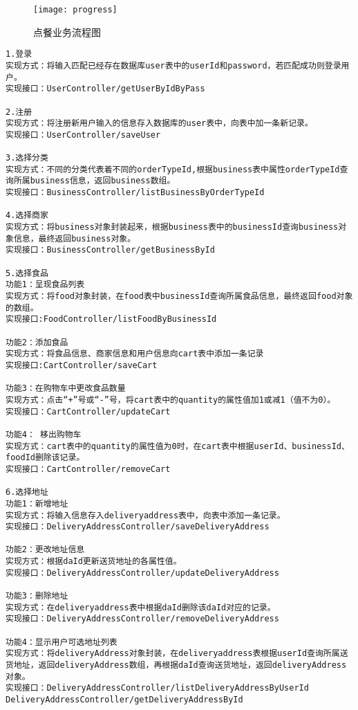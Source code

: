 \begin{figure}[htbp]
\centering
\texttt{[image: progress]}
\caption{点餐业务流程图}\label{fig:xml}
\vspace{\baselineskip}
\end{figure}
\begin{verbatim}
1.登录
实现方式：将输入匹配已经存在数据库user表中的userId和password，若匹配成功则登录用户。
实现接口：UserController/getUserByIdByPass

2.注册
实现方式：将注册新用户输入的信息存入数据库的user表中，向表中加一条新记录。
实现接口：UserController/saveUser

3.选择分类
实现方式：不同的分类代表着不同的orderTypeId,根据business表中属性orderTypeId查询所属business信息，返回business数组。
实现接口：BusinessController/listBusinessByOrderTypeId

4.选择商家
实现方式：将business对象封装起来，根据business表中的businessId查询business对象信息，最终返回business对象。
实现接口：BusinessController/getBusinessById

5.选择食品
功能1：呈现食品列表
实现方式：将food对象封装，在food表中businessId查询所属食品信息，最终返回food对象的数组。
实现接口:FoodController/listFoodByBusinessId

功能2：添加食品
实现方式：将食品信息、商家信息和用户信息向cart表中添加一条记录
实现接口:CartController/saveCart

功能3：在购物车中更改食品数量
实现方式：点击“+”号或“-”号，将cart表中的quantity的属性值加1或减1（值不为0）。
实现接口：CartController/updateCart

功能4： 移出购物车
实现方式：cart表中的quantity的属性值为0时，在cart表中根据userId、businessId、foodId删除该记录。
实现接口：CartController/removeCart

6.选择地址
功能1：新增地址
实现方式：将输入信息存入deliveryaddress表中，向表中添加一条记录。
实现接口：DeliveryAddressController/saveDeliveryAddress

功能2：更改地址信息
实现方式：根据daId更新送货地址的各属性值。
实现接口：DeliveryAddressController/updateDeliveryAddress

功能3：删除地址
实现方式：在deliveryaddress表中根据daId删除该daId对应的记录。
实现接口：DeliveryAddressController/removeDeliveryAddress

功能4：显示用户可选地址列表
实现方式：将deliveryAddress对象封装，在deliveryaddress表根据userId查询所属送货地址，返回deliveryAddress数组，再根据daId查询送货地址，返回deliveryAddress对象。
实现接口：DeliveryAddressController/listDeliveryAddressByUserId
DeliveryAddressController/getDeliveryAddressById


\end{verbatim}
